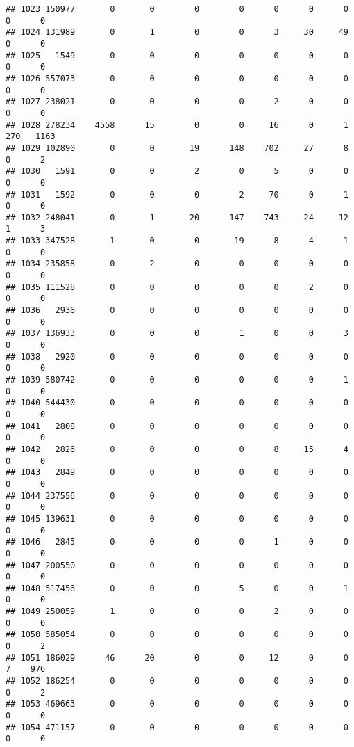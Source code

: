 \documentclass[
]{article}
\begin{document}
\begin{verbatim}
## 1023 150977       0       0        0        0      0      0      0     0      0
## 1024 131989       0       1        0        0      3     30     49     0      0
## 1025   1549       0       0        0        0      0      0      0     0      0
## 1026 557073       0       0        0        0      0      0      0     0      0
## 1027 238021       0       0        0        0      2      0      0     0      0
## 1028 278234    4558      15        0        0     16      0      1   270   1163
## 1029 102890       0       0       19      148    702     27      8     0      2
## 1030   1591       0       0        2        0      5      0      0     0      0
## 1031   1592       0       0        0        2     70      0      1     0      0
## 1032 248041       0       1       20      147    743     24     12     1      3
## 1033 347528       1       0        0       19      8      4      1     0      0
## 1034 235858       0       2        0        0      0      0      0     0      0
## 1035 111528       0       0        0        0      0      2      0     0      0
## 1036   2936       0       0        0        0      0      0      0     0      0
## 1037 136933       0       0        0        1      0      0      3     0      0
## 1038   2920       0       0        0        0      0      0      0     0      0
## 1039 580742       0       0        0        0      0      0      1     0      0
## 1040 544430       0       0        0        0      0      0      0     0      0
## 1041   2808       0       0        0        0      0      0      0     0      0
## 1042   2826       0       0        0        0      8     15      4     0      0
## 1043   2849       0       0        0        0      0      0      0     0      0
## 1044 237556       0       0        0        0      0      0      0     0      0
## 1045 139631       0       0        0        0      0      0      0     0      0
## 1046   2845       0       0        0        0      1      0      0     0      0
## 1047 200550       0       0        0        0      0      0      0     0      0
## 1048 517456       0       0        0        5      0      0      1     0      0
## 1049 250059       1       0        0        0      2      0      0     0      0
## 1050 585054       0       0        0        0      0      0      0     0      2
## 1051 186029      46      20        0        0     12      0      0     7    976
## 1052 186254       0       0        0        0      0      0      0     0      2
## 1053 469663       0       0        0        0      0      0      0     0      0
## 1054 471157       0       0        0        0      0      0      0     0      0

\end{verbatim}
\end{document}
